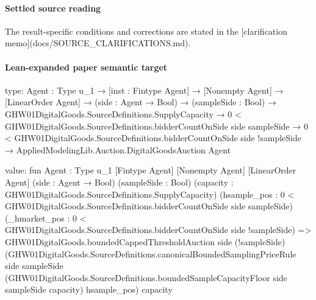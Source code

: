 \documentclass[10pt]{article}
\begin{document}
\paragraph{Settled source reading}
\begin{sloppypar}
The result-\allowbreak{}specific conditions and corrections are stated in the [clarification memo](docs/\allowbreak{}SOURCE\_\allowbreak{}CLARIFICATIONS.\allowbreak{}md).\allowbreak{}
\end{sloppypar}

\paragraph{Lean-expanded paper semantic target}
\begin{ReviewVerbatim}
type:
{Agent : Type u_1} →
  [inst : Fintype Agent] →
    [Nonempty Agent] →
      [LinearOrder Agent] →
        (side : Agent → Bool) →
          (sampleSide : Bool) →
            GHW01DigitalGoods.SourceDefinitions.SupplyCapacity →
              0 < GHW01DigitalGoods.SourceDefinitions.bidderCountOnSide side sampleSide →
                0 < GHW01DigitalGoods.SourceDefinitions.bidderCountOnSide side !sampleSide →
                  AppliedModelingLib.Auction.DigitalGoodsAuction Agent

value:
fun {Agent : Type u_1} [Fintype Agent] [Nonempty Agent] [LinearOrder Agent] (side : Agent → Bool) (sampleSide : Bool)
    (capacity : GHW01DigitalGoods.SourceDefinitions.SupplyCapacity)
    (hsample_pos : 0 < GHW01DigitalGoods.SourceDefinitions.bidderCountOnSide side sampleSide)
    (_hmarket_pos : 0 < GHW01DigitalGoods.SourceDefinitions.bidderCountOnSide side !sampleSide) =>
  GHW01DigitalGoods.boundedCappedThresholdAuction side (!sampleSide)
    (GHW01DigitalGoods.SourceDefinitions.canonicalBoundedSamplingPriceRule side sampleSide
      (GHW01DigitalGoods.SourceDefinitions.boundedSampleCapacityFloor side sampleSide capacity) hsample_pos)
    capacity
\end{ReviewVerbatim}
\end{document}

